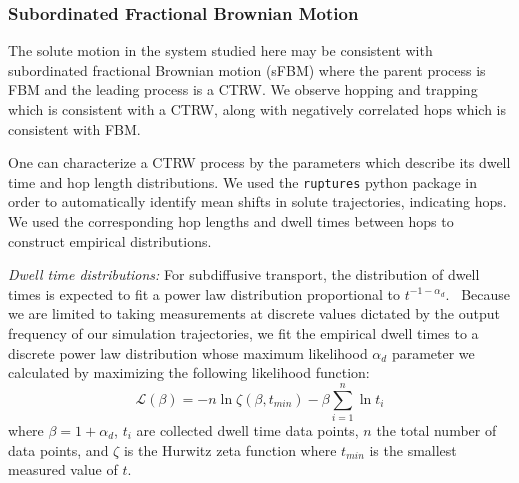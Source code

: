 \documentclass{article}
\begin{document}
  \subsubsection*{Subordinated Fractional Brownian Motion}
  
  The solute motion in the system studied here may be consistent with 
  subordinated fractional Brownian motion (sFBM) where the parent process is FBM and 
  the leading process is a CTRW. We observe hopping and trapping which is consistent
  with a CTRW, along with negatively correlated hops which is consistent with FBM.  

  One can characterize a CTRW process 
  by 
  the parameters which describe its dwell 
  time and hop length distributions. We used the \texttt{ruptures} python package in 
  order to automatically identify mean shifts in solute trajectories, indicating hops.\cite{truong_ruptures:_2018} 
  We used the corresponding hop lengths and dwell times between hops to construct 
  empirical distributions.
  
  \textit{Dwell time distributions:} For subdiffusive transport, the distribution 
  of dwell times is expected to fit a power law distribution 
  proportional to $t^{-1-\alpha_d}$.~\cite{meroz_toolbox_2015}
  Because we are limited to taking measurements at discrete values dictated by the output 
  frequency of our simulation trajectories, we fit the empirical dwell times
  to a discrete power law distribution whose maximum likelihood $\alpha_d$ 
  parameter we calculated by maximizing the following likelihood function: 
  \begin{equation}
	\mathcal{L}(\beta) = -n\ln \zeta(\beta, t_{min}) -
	\beta\sum_{i=1}^{n} \ln t_i 
  \label{eqn:powerlaw_likelihood}
  \end{equation}
  where $\beta = 1 + \alpha_d$, $t_i$ are collected dwell time data points,
  $n$ the total number of data points, and $\zeta$ is the Hurwitz zeta function
  where $t_{min}$ is the smallest measured value of	$t$.~\cite{clauset_power-law_2009}
  
\end{document}

